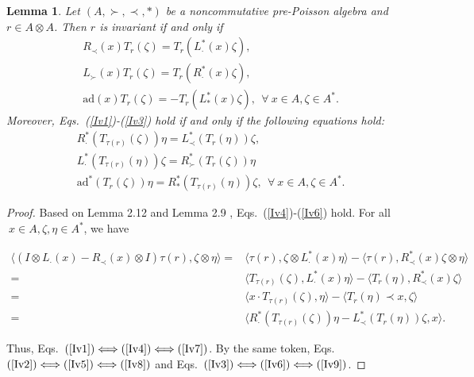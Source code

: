 \documentclass[12pt]{amsart}
\newtheorem{lem}[thm]{Lemma}
\theoremstyle{definition}
\begin{document}
\begin{lem} \label{In1}
 Let $(A, \succ,\prec,\ast)$ be a noncommutative pre-Poisson algebra and $r\in A\otimes A$. Then $r$ is invariant if and only if
 \begin{align}&
\label{Iv4}R_{\prec}(x) T_{r}(\zeta)=T_{r}(L_{\cdot}^{*}(x)\zeta),\\&
\label{Iv5}L_{\succ}(x) T_{r}(\zeta)=T_{r}(R_{\cdot}^{*}(x)\zeta),
\\&\label{Iv6}\mathrm{ad}(x) T_{r}(\zeta)=-T_{r}(L_{\ast}^{*}(x)\zeta),~~\forall~x\in A,\zeta\in A^{*}.
\end{align}
Moreover, Eqs.~(\ref{Iv1})-(\ref{Iv3}) hold if and only if the following equations hold:
\begin{align}&\label{Iv7}R_{\cdot}^{*}(T_{\tau(r)}(\zeta))\eta=L_{\prec}^{*}(T_{r}(\eta))\zeta,\\&
\label{Iv8}L_{\cdot}^{*} (T_{\tau(r)}(\eta))\zeta=R_{\succ}^{*}(T_{r}(\zeta))\eta
\\&\label{Iv9}\mathrm{ad}^{*} (T_{r}(\zeta))\eta=R_{\ast}^{*}(T_{\tau(r)}(\eta))\zeta,~~\forall~x\in A,\zeta\in A^{*}.
\end{align}
\end{lem}
\begin{proof} Based on Lemma 2.12 \cite{Wa} and Lemma 2.9 \cite{Wbl}, Eqs.~(\ref{Iv4})-(\ref{Iv6}) hold.
For all $~x\in A,\zeta,\eta\in A^{*}$, we have
\begin{small}
\begin{align*}\langle(I\otimes L_{\cdot}(x)-R_{\prec}(x)\otimes I)\tau(r),\zeta\otimes \eta\rangle
=&\langle \tau(r),\zeta\otimes L_{\cdot}^{*}(x)\eta\rangle-\langle \tau(r),R_{\prec}^{*}(x)\zeta\otimes \eta\rangle
\\=&\langle T_{\tau(r)}(\zeta), L_{\cdot}^{*}(x)\eta\rangle-\langle T_{r}(\eta), R_{\prec}^{*}(x)\zeta\rangle
\\=&\langle x\cdot T_{\tau(r)}(\zeta),\eta\rangle-\langle T_{r}(\eta)\prec x, \zeta\rangle
\\=&\langle R_{\cdot}^{*}(T_{\tau(r)}(\zeta))\eta-L_{\prec}^{*}(T_{r}(\eta))\zeta,x\rangle.\end{align*}
\end{small}
Thus, Eqs.~$(\ref{Iv1})\Longleftrightarrow (\ref{Iv4})\Longleftrightarrow (\ref{Iv7})$. By the same token,
Eqs.~$(\ref{Iv2})\Longleftrightarrow (\ref{Iv5})\Longleftrightarrow (\ref{Iv8})$
and Eqs.~$(\ref{Iv3})\Longleftrightarrow (\ref{Iv6})\Longleftrightarrow (\ref{Iv9})$.

\end{proof}
\end{document}
